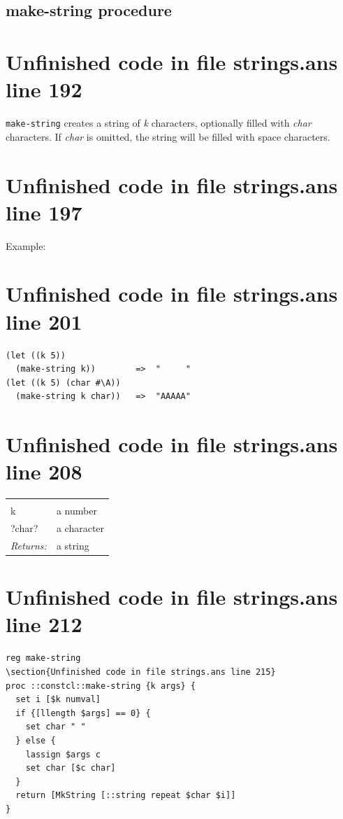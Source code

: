 \documentclass[twoside,9pt]{report}
\begin{document}
\subsection{make-string procedure}
\label{make-string-procedure}
\section{Unfinished code in file strings.ans line 192}


\texttt{make-string} creates a string of \emph{k} characters, optionally filled with \emph{char} characters. If \emph{char} is omitted, the string will be filled with space characters.

\section{Unfinished code in file strings.ans line 197}


Example:

\section{Unfinished code in file strings.ans line 201}
\begin{verbatim}
(let ((k 5))
  (make-string k))        =>  "     "
(let ((k 5) (char #\A))
  (make-string k char))   =>  "AAAAA"
\end{verbatim}
\section{Unfinished code in file strings.ans line 208}
\noindent\begin{tabular}{ |p{1.9cm} p{8cm}| }
\hline
\rowcolor[HTML]{CCCCCC} \multicolumn{2}{|l|}{\bf make-string (public)} \\
k & a number \\
?char? & a character \\
\textit{Returns:} & a string \\
\hline
\end{tabular}
\section{Unfinished code in file strings.ans line 212}
\begin{lstlisting}
reg make-string
\section{Unfinished code in file strings.ans line 215}
proc ::constcl::make-string {k args} {
  set i [$k numval]
  if {[llength $args] == 0} {
    set char " "
  } else {
    lassign $args c
    set char [$c char]
  }
  return [MkString [::string repeat $char $i]]
}
\end{lstlisting}
\end{document}
